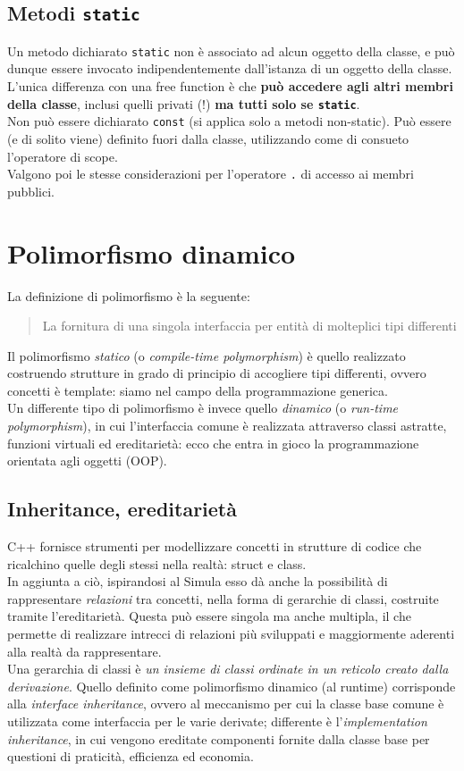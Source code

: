 \documentclass[10pt, oneside]{book}
\begin{document}
\section{Metodi \texttt{static}}
Un metodo dichiarato \texttt{static} non è associato ad alcun oggetto della classe, e può dunque essere invocato indipendentemente dall'istanza di un oggetto della classe. L'unica differenza con una free function è che \textbf{può accedere agli altri membri della classe}, inclusi quelli privati (!) \textbf{ma tutti solo se \texttt{static}}.\\
Non può essere dichiarato \texttt{const} (si applica solo a metodi non-static). Può essere (e di solito viene) definito fuori dalla classe, utilizzando come di consueto l'operatore di scope.\\
Valgono poi le stesse considerazioni per l'operatore \texttt{.} di accesso ai membri pubblici.

\chapter{Polimorfismo dinamico}
La definizione di polimorfismo è la seguente:
\begin{quote}
La fornitura di una singola interfaccia per entità di molteplici tipi differenti
\end{quote}
Il polimorfismo \textit{statico} (o \textit{compile-time polymorphism}) è quello realizzato costruendo strutture in grado di principio di accogliere tipi differenti, ovvero concetti è template: siamo nel campo della programmazione generica.\\
Un differente tipo di polimorfismo è invece quello \textit{dinamico} (o \textit{run-time polymorphism}), in cui l'interfaccia comune è realizzata attraverso classi astratte, funzioni virtuali ed ereditarietà: ecco che entra in gioco la programmazione orientata agli oggetti (OOP).

\section{Inheritance, ereditarietà}
C++ fornisce strumenti per modellizzare concetti in strutture di codice che ricalchino quelle degli stessi nella realtà: struct e class.\\
In aggiunta a ciò, ispirandosi al Simula esso dà anche la possibilità di rappresentare \textit{relazioni} tra concetti, nella forma di gerarchie di classi, costruite tramite l'ereditarietà. Questa può essere singola ma anche multipla, il che permette di realizzare intrecci di relazioni più sviluppati e maggiormente aderenti alla realtà da rappresentare.\\
Una gerarchia di classi è \textit{un insieme di classi ordinate in un reticolo creato dalla derivazione}.
Quello definito come polimorfismo dinamico (al runtime) corrisponde alla \textit{interface inheritance}, ovvero al meccanismo per cui la classe base comune è utilizzata come interfaccia per le varie derivate; differente è l'\textit{implementation inheritance}, in cui vengono ereditate componenti fornite dalla classe base per questioni di praticità, efficienza ed economia.
\end{document}
